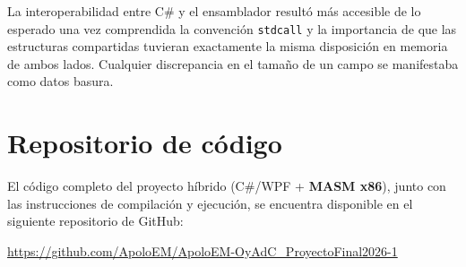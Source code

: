 \documentclass[a4paper,12pt]{article}
\begin{document}
La interoperabilidad entre C\# y el ensamblador resultó más accesible de lo esperado una vez comprendida la convención \texttt{stdcall} y la importancia de que las estructuras compartidas tuvieran exactamente la misma disposición en memoria de ambos lados. Cualquier discrepancia en el tamaño de un campo se manifestaba como datos basura.

\newpage
\nocite{*}
\printbibliography[title={Referencias}]

\appendix
\section{Repositorio de código}
El código completo del proyecto híbrido (C\#/WPF + \textbf{MASM x86}), junto con las instrucciones de compilación y ejecución, se encuentra disponible en el siguiente repositorio de GitHub:

\begin{center}
\url{https://github.com/ApoloEM/ApoloEM-OyAdC_ProyectoFinal2026-1}
\end{center}
\end{document}
